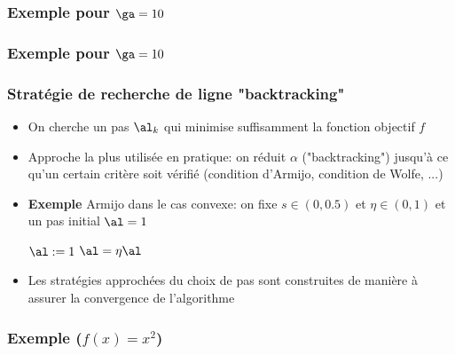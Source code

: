 \documentclass[9pt,table]{beamer} %
\begin{document}
\begin{frame}
\frametitle{Exemple pour $\ga=10$}

\begin{figure}
	
\end{figure}
\end{frame}

\begin{frame}
\frametitle{Exemple pour $\ga=10$}

\begin{figure}
	
\end{figure}
\end{frame}


\begin{frame}
\frametitle{Stratégie de recherche de ligne "backtracking"}

\begin{itemize}[label=\tiny$\blacksquare$]
	\item On cherche un pas $\al_k$ qui minimise \alert{suffisamment} la fonction objectif $f$

	
	\item Approche la plus utilisée en pratique: on réduit $\alpha$ ("\alert{backtracking}") jusqu'à ce qu'un certain critère soit vérifié (\eg condition d'\alert{Armijo}, condition de \alert{Wolfe}, ...)
	
	\item \textbf{Exemple} Armijo dans le cas convexe:
	on fixe $s \in (0,0.5)$ et $\eta \in (0,1)$ et un pas initial $\al = 1$
	
	\begin{tcolorbox}[width=0.7\textwidth]
	\begin{algorithmic}
	\STATE $\al := 1$
		\STATE $\al = \eta \al$
	\ENDWHILE
	\end{algorithmic}
	\end{tcolorbox}
	
	\item Les stratégies approchées du choix de pas sont construites de manière à assurer la convergence de l'algorithme
\end{itemize}
\end{frame}

\begin{frame}
\frametitle{Exemple ($f(x) = x^2$)}
\begin{figure}
	
\end{figure}
\end{frame}
\end{document}

